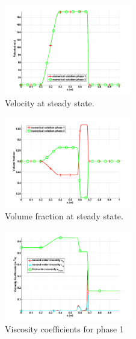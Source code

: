 \documentclass{anstrans}
\begin{document}
\begin{figure}[H]
                \centering
                \includegraphics[width=0.495\textwidth]{plots/relaxation_two_phases_velocity.png}
                \caption{Velocity at steady state.}
                \label{fig:velocity}
\end{figure}
\begin{figure}[H]
                \centering
                \includegraphics[width=0.495\textwidth]{plots/relaxation_two_phases_volume_fraction.png}
                \caption{Volume fraction at steady state.}
                \label{fig:volume_fraction}
\end{figure}
\begin{figure}[H]    
                \centering
                \includegraphics[width=0.495\textwidth]{plots/relaxation_two_phases_liquid_viscosity_kappa_mu.png}
                \caption{Viscosity coefficients for phase 1}
                \label{fig:viscosity_coeff_liq}
\end{figure}
\end{document}
